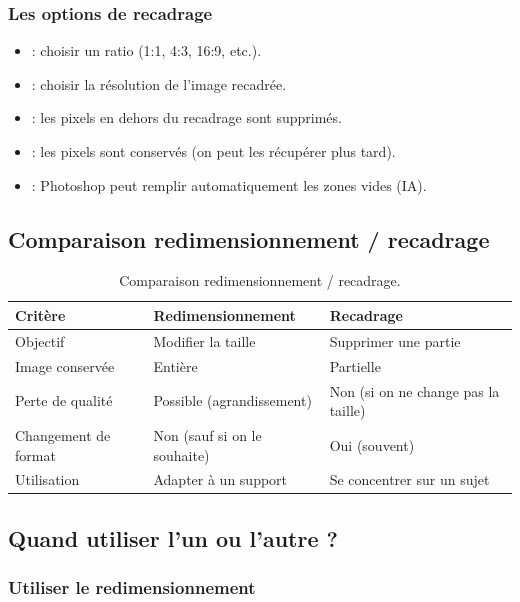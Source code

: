 \subsubsection{Les options de recadrage}

\begin{itemize}
    \item {} : choisir un ratio (1:1, 4:3, 16:9, etc.).
    \item {} : choisir la résolution de l'image recadrée.
    \item {} : les pixels en dehors du recadrage sont supprimés.
    \item {} : les pixels sont conservés (on peut les récupérer plus tard).
    \item {} : Photoshop peut remplir automatiquement les zones vides (IA).
\end{itemize}

\subsection{Comparaison redimensionnement / recadrage}

\begin{table}[h!]
\centering
\begin{tabular}{@{}p{4cm}p{5cm}p{5cm}@{}}
\toprule
\textbf{Critère} & \textbf{Redimensionnement} & \textbf{Recadrage} \\
\midrule
Objectif & Modifier la taille & Supprimer une partie \\
Image conservée & Entière & Partielle \\
Perte de qualité & Possible (agrandissement) & Non (si on ne change pas la taille) \\
Changement de format & Non (sauf si on le souhaite) & Oui (souvent) \\
Utilisation & Adapter à un support & Se concentrer sur un sujet \\
\bottomrule
\end{tabular}
\caption{Comparaison redimensionnement / recadrage.}
\end{table}

\subsection{Quand utiliser l'un ou l'autre ?}

\subsubsection{Utiliser le redimensionnement}

